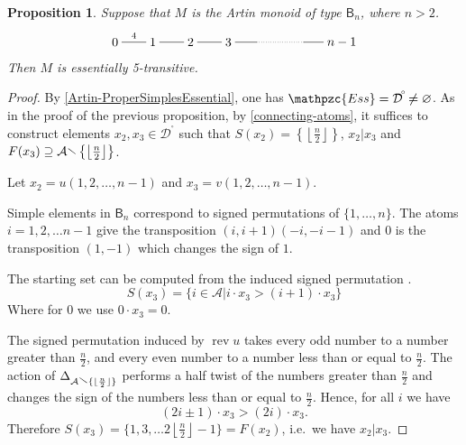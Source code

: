 \documentclass[a4paper,final]{article}
\let\emptyset\varnothing
\theoremstyle{plain}
\newtheorem{proposition}[proposition]{Proposition}
\theoremstyle{remark}
\theoremstyle{definition}
\begin{document}
{}

\begin{proposition}
  Suppose that $M$ is the Artin monoid of type ${\mathsf{{B}}}_n$, where $n>2$.
  \[
    \begin{xy}
      0;<3em,0em>:<0em,3em>::
      
      (0,0)*+{0}="0";
      (1,0)*+{1}="1";
      (2,0)*+{2}="2";
      (3,0)*+{3}="3";
      (3.75,0)="4";
      (5,0)="5";
      (6,0)*+{n-1}="6";
      
      {\ar@{-}^{4}  "0";"1"};
      {\ar@{-}     "1";"2"};
      {\ar@{-}     "2";"3"};
      {\ar@{-}     "3";"4"};
      {\ar@{..}    "4";"5"};
      {\ar@{-}     "5";"6"};
    \end{xy}
  \]
  Then $M$ is essentially 5-transitive.
\end{proposition}
\begin{proof}
  By \autoref{Artin-ProperSimplesEssential}, one has ${\mathpzc{Ess}}={{\mathcal{D}}^{\!{}^{\circ}\!}}\neq\emptyset$.
  As in the proof of the previous proposition, by
  \autoref{connecting-atoms}, it suffices to construct elements $x_2,
  x_3 \in {{\mathcal{D}}^{\!{}^{\circ}\!}}$ such that ${S}(x_2) =
  \left\{\left\lfloor\frac{n}{2}\right\rfloor\right\}$, $x_2 | x_3$
  and ${F}(x_3) \supseteq {\mathcal{A}} {\mathbin{\raisebox{0.25ex}{$\smallsetminus$}}}
  \left\{\left\lfloor\frac{n}{2}\right\rfloor\right\}$.

  Let $x_2 = u(1,2, \ldots, n-1)$ and $x_3 = v(1,2,\ldots,n-1)$.  

  Simple elements in ${\mathsf{{B}}}_n$ correspond to signed permutations
  of $\{1,\ldots,n\}$.  The atoms $i = 1, 2, \ldots n-1$ give the
  transposition $(i,i+1)(-i,-i-1)$ and $0$ is the transposition
  $(1,-1)$ which changes the sign of $1$.

  The starting set can be computed from the induced signed
  permutation \cite[Proposition 8.1.2]{CombCox}.
  \[
    {S}(x_3) = \{ i \in {\mathcal{A}} {\boldsymbol{\mid}} i\cdot x_3 > (i+1)\cdot x_3\}
  \]
  Where for $0$ we use $0\cdot x_3 = 0$.

  The signed permutation induced by $\operatorname{rev} u$ takes every odd number to
  a number greater than $\frac{n}{2}$, and every even number to a
  number less than or equal to $\frac{n}{2}$.  The action of
  $\Delta_{{\mathcal{A}}{\mathbin{\raisebox{0.25ex}{$\smallsetminus$}}}\{\lfloor\frac{n}{2}\rfloor\}}$ performs a
  half twist of the numbers greater than $\frac{n}{2}$ and changes the
  sign of the numbers less than or equal to $\frac{n}{2}$.  Hence, for
  all $i$ we have
  \[ (2i\pm 1)\cdot x_3 > (2i)\cdot x_3. \] 
  Therefore ${S}(x_3) = \{ 1, 3, \ldots
  2\left\lfloor\frac{n}{2}\right\rfloor - 1\} = {F}(x_2)$, i.e.\ we
  have $x_2|x_3$.
\end{proof}
\end{document}

